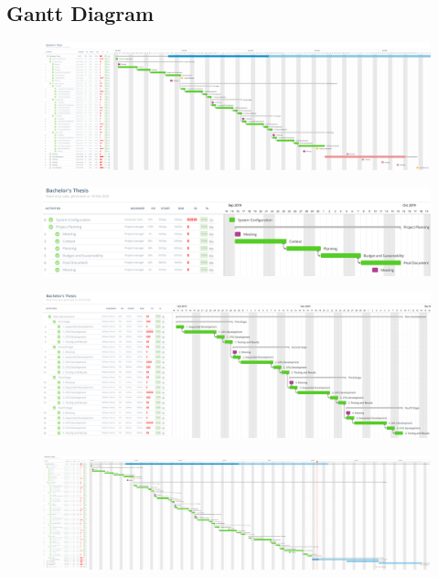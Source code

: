 \documentclass[titlepage,12pt]{report}
\begin{document}
\begin{appendices}
\chapter{Gantt Diagram}

\uselandscape

\begin{figure}[H]
	\centering
	\includegraphics[scale=0.30]{media/final_gantt_esp.png}
	\label{gantt_esp}
\end{figure}

\begin{figure}[H]
	\centering
  	\includegraphics[scale=0.25]{media/gantt_gep.png}
  	\label{gantt_1}
\end{figure}

\begin{figure}[H]
	\centering
  	\includegraphics[scale=0.25]{media/gantt_dev_esp.png}
  	\label{gantt_2}
\end{figure}

\begin{figure}[H]
	\centering
	\includegraphics[scale=0.30]{media/final_gantt_eng.png}
	\label{gantt_eng}
\end{figure}


\end{appendices}
\end{document}
